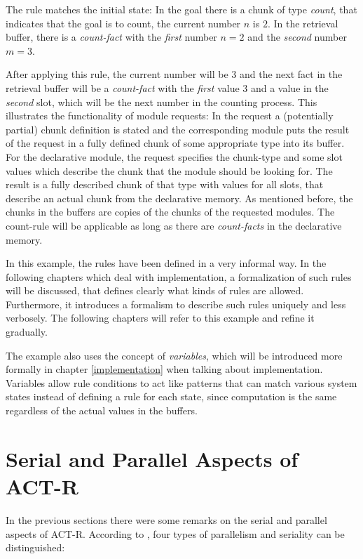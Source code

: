 The rule matches the initial state: In the goal there is a chunk of type \emph{count}, that indicates that the goal is to count, the current number $n$ is $2$. In the retrieval buffer, there is a \emph{count-fact} with the \emph{first} number $n = 2$ and the \emph{second} number $m = 3$. 

After applying this rule, the current number will be $3$ and the next fact in the retrieval buffer will be a \emph{count-fact} with the \emph{first} value $3$ and a value in the \emph{second} slot, which will be the next number in the counting process. This illustrates the functionality of module requests: In the request a (potentially partial) chunk definition is stated and the corresponding module puts the result of the request in a fully defined chunk of some appropriate type into its buffer. For the declarative module, the request specifies the chunk-type and some slot values which describe the chunk that the module should be looking for. The result is a fully described chunk of that type with values for all slots, that describe an actual chunk from the declarative memory. As mentioned before, the chunks in the buffers are copies of the chunks of the requested modules. The count-rule will be applicable as long as there are \emph{count-facts} in the declarative memory. %

In this example, the rules have been defined in a very informal way. In the following chapters which deal with implementation, a formalization of such rules will be discussed, that defines clearly what kinds of rules are allowed. Furthermore, it introduces a formalism to describe such rules uniquely and less verbosely. The following chapters will refer to this example and refine it gradually.

The example also uses the concept of \emph{variables}, which will be introduced more formally in chapter \ref{implementation} when talking about implementation. Variables allow rule conditions to act like patterns that can match various system states instead of defining a rule for each state, since computation is the same regardless of the actual values in the buffers.

\section{Serial and Parallel Aspects of ACT-R}
\label{serial_parallel_aspects}

In the previous sections there were some remarks on the serial and parallel aspects of ACT-R. According to \cite[p. 68]{anderson_how_2007}, four types of parallelism and seriality can be distinguished:

